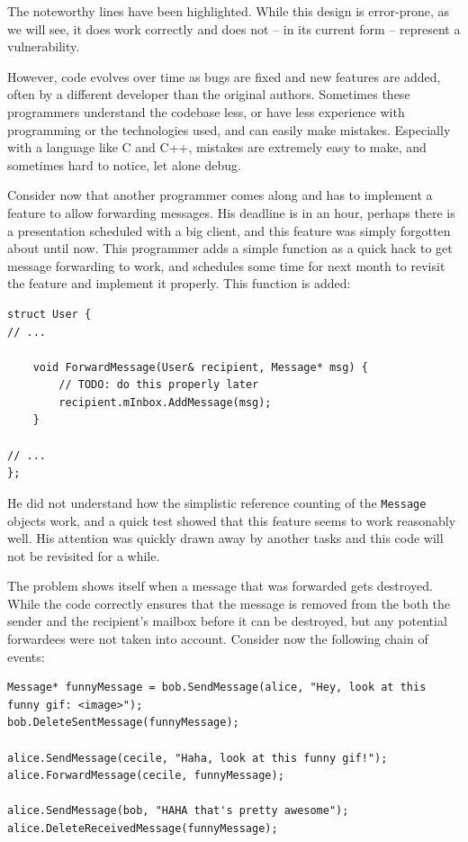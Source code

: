 The noteworthy lines have been highlighted. While this design is error-prone, as we will see, it does work correctly and does not -- in its current form -- represent a vulnerability.

However, code evolves over time as bugs are fixed and new features are added, often by a different developer than the original authors. Sometimes these programmers understand the codebase less, or have less experience with programming or the technologies used, and can easily make mistakes. Especially with a language like C and C++, mistakes are extremely easy to make, and sometimes hard to notice, let alone debug.

Consider now that another programmer comes along and has to implement a feature to allow forwarding messages. His deadline is in an hour, perhaps there is a presentation scheduled with a big client, and this feature was simply forgotten about until now. This programmer adds a simple function as a quick hack to get message forwarding to work, and schedules some time for next month to revisit the feature and implement it properly. This function is added:

\begin{lstlisting}
struct User {
// ...

	void ForwardMessage(User& recipient, Message* msg) {
		// TODO: do this properly later
		recipient.mInbox.AddMessage(msg);
	}

// ...
};
\end{lstlisting}

He did not understand how the simplistic reference counting of the \lstinline!Message! objects work, and a quick test showed that this feature seems to work reasonably well. His attention was quickly drawn away by another tasks and this code will not be revisited for a while.

The problem shows itself when a message that was forwarded gets destroyed. While the code correctly ensures that the message is removed from the both the sender and the recipient's mailbox before it can be destroyed, but any potential forwardees were not taken into account. Consider now the following chain of events:

\begin{lstlisting}
Message* funnyMessage = bob.SendMessage(alice, "Hey, look at this funny gif: <image>");
bob.DeleteSentMessage(funnyMessage);

alice.SendMessage(cecile, "Haha, look at this funny gif!");
alice.ForwardMessage(cecile, funnyMessage);

alice.SendMessage(bob, "HAHA that's pretty awesome");
alice.DeleteReceivedMessage(funnyMessage);
\end{lstlisting}

